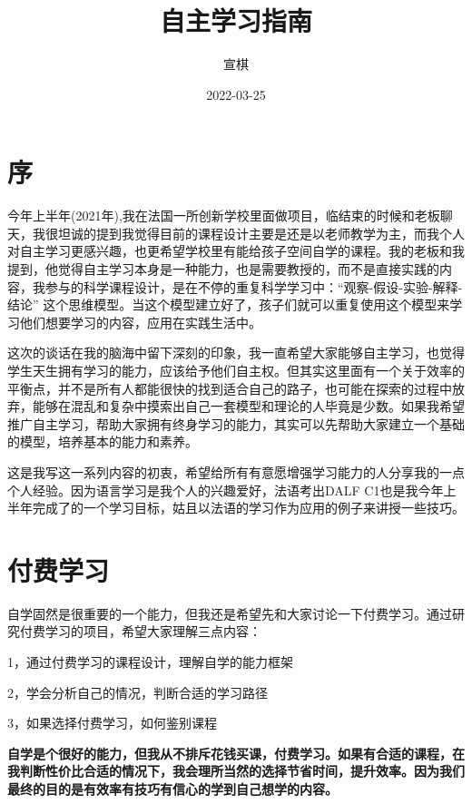 \documentclass[
]{book}
\title{自主学习指南}
\author{宣棋}
\date{2022-03-25}
\begin{document}
\maketitle

{
\setcounter{tocdepth}{1}
\tableofcontents
}
\hypertarget{ux5e8f}{%
\chapter{序}\label{ux5e8f}}

今年上半年(2021年),我在法国一所创新学校里面做项目，临结束的时候和老板聊天，我很坦诚的提到我觉得目前的课程设计主要是还是以老师教学为主，而我个人对自主学习更感兴趣，也更希望学校里有能给孩子空间自学的课程。我的老板和我提到，他觉得自主学习本身是一种能力，也是需要教授的，而不是直接实践的内容，我参与的科学课程设计，是在不停的重复科学学习中：``观察-假设-实验-解释-结论'' 这个思维模型。当这个模型建立好了，孩子们就可以重复使用这个模型来学习他们想要学习的内容，应用在实践生活中。

这次的谈话在我的脑海中留下深刻的印象，我一直希望大家能够自主学习，也觉得学生天生拥有学习的能力，应该给予他们自主权。但其实这里面有一个关于效率的平衡点，并不是所有人都能很快的找到适合自己的路子，也可能在探索的过程中放弃，能够在混乱和复杂中摸索出自己一套模型和理论的人毕竟是少数。如果我希望推广自主学习，帮助大家拥有终身学习的能力，其实可以先帮助大家建立一个基础的模型，培养基本的能力和素养。

这是我写这一系列内容的初衷，希望给所有有意愿增强学习能力的人分享我的一点个人经验。因为语言学习是我个人的兴趣爱好，法语考出DALF C1也是我今年上半年完成了的一个学习目标，姑且以法语的学习作为应用的例子来讲授一些技巧。

\hypertarget{ux4ed8ux8d39ux5b66ux4e60}{%
\chapter{付费学习}\label{ux4ed8ux8d39ux5b66ux4e60}}

自学固然是很重要的一个能力，但我还是希望先和大家讨论一下付费学习。通过研究付费学习的项目，希望大家理解三点内容：

1，通过付费学习的课程设计，理解自学的能力框架

2，学会分析自己的情况，判断合适的学习路径

3，如果选择付费学习，如何鉴别课程

\textbf{自学是个很好的能力，但我从不排斥花钱买课，付费学习。如果有合适的课程，在我判断性价比合适的情况下，我会理所当然的选择节省时间，提升效率。因为我们最终的目的是有效率有技巧有信心的学到自己想学的内容。}
\end{document}

